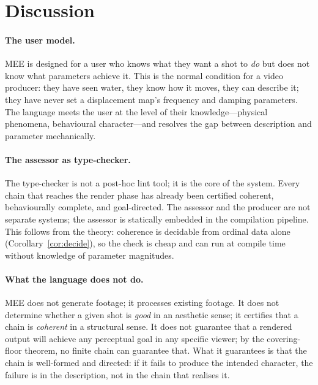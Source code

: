 \documentclass[twocolumn,11pt,a4paper]{article}
\theoremstyle{mee}
\theoremstyle{definition}
\theoremstyle{remark}
\begin{document}
\section{Discussion}
\label{sec:discussion}

\paragraph{The user model.}
MEE is designed for a user who knows what they want a shot to \emph{do}
but does not know what parameters achieve it. This is the normal condition
for a video producer: they have seen water, they know how it moves, they
can describe it; they have never set a displacement map's frequency and
damping parameters. The language meets the user at the level of their
knowledge---physical phenomena, behavioural character---and resolves the
gap between description and parameter mechanically.

\paragraph{The assessor as type-checker.}
The type-checker is not a post-hoc lint tool; it is the core of the
system. Every chain that reaches the render phase has already been
certified coherent, behaviourally complete, and goal-directed. The
assessor and the producer are not separate systems; the assessor is
statically embedded in the compilation pipeline. This follows from the
theory: coherence is decidable from ordinal data alone
(Corollary~\ref{cor:decide}), so the check is cheap and can run at
compile time without knowledge of parameter magnitudes.

\paragraph{What the language does not do.}
MEE does not generate footage; it processes existing footage. It does not
determine whether a given shot is \emph{good} in an aesthetic sense; it
certifies that a chain is \emph{coherent} in a structural sense. It does
not guarantee that a rendered output will achieve any perceptual goal in
any specific viewer; by the covering-floor theorem, no finite chain can
guarantee that. What it guarantees is that the chain is well-formed and
directed: if it fails to produce the intended character, the failure is
in the description, not in the chain that realises it.
\end{document}
